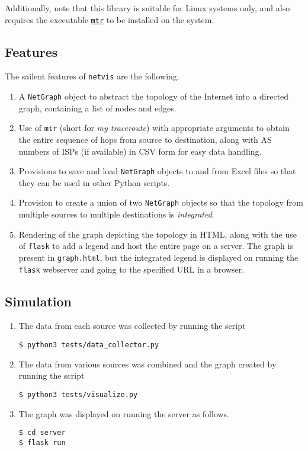 \documentclass[journal,12pt,twocolumn]{IEEEtran}
\begin{document}
Additionally, note that this library is suitable for Linux systems only, and
also requires the executable
\href{https://linux.die.net/man/8/mtr}{\texttt{mtr}} to be installed on the
system.

\subsection{Features}

The sailent features of \texttt{netvis} are the following.
\begin{enumerate}
     \item A \texttt{NetGraph} object to abstract the topology of the Internet
     into a directed graph, containing a list of nodes and edges.
     \item Use of \texttt{mtr} (short for \emph{my traceroute}) with appropriate
     arguments to obtain the entire sequence of hops from source to destination,
     along with AS numbers of ISPs (if available) in CSV form for easy data
     handling.
     \item Provisions to save and load \texttt{NetGraph} objects to and from
     Excel files so that they can be used in other Python scripts.
     \item Provision to create a union of two \texttt{NetGraph} objects so that
     the topology from multiple sources to multiple destinations is
     \emph{integrated}.
     \item Rendering of the graph depicting the topology in HTML, along with the
     use of \texttt{flask} to add a legend and host the entire page on a server.
     The graph is present in \texttt{graph.html}, but the integrated legend is
     displayed on running the \texttt{flask} webserver and going to the
     specified URL in a browser.
\end{enumerate}

\subsection{Simulation}

\begin{enumerate}
     \item The data from each source was collected by running the script
     \begin{lstlisting}
$ python3 tests/data_collector.py
     \end{lstlisting}
     \item The data from various sources was combined and the graph created by
     running the script
     \begin{lstlisting}
$ python3 tests/visualize.py
     \end{lstlisting}
     \item The graph was displayed on running the server as follows.
     \begin{lstlisting}
$ cd server
$ flask run
     \end{lstlisting}
\end{enumerate}
\end{document}
